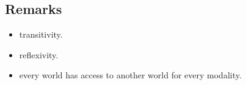 \documentclass[oneside,openany]{tufte-book} %
\begin{document}
\subsection{Remarks}

\begin{itemize}[topsep=0pt,itemsep=-1ex,partopsep=1ex,parsep=1ex]
\item transitivity.
\item reflexivity.
\item every world has access to another world for every modality.
\end{itemize}



\backmatter




\end{document}
